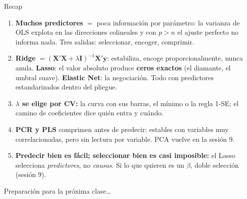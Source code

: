 \documentclass{beamer}
\newcommand{\1}{\mathbb{I}}
\begin{document}
\begin{frame}{Recap}
\small
\begin{enumerate}\itemsep6pt
  \item \textbf{Muchos predictores} $=$ poca información por parámetro: la varianza de OLS explota en las direcciones colineales y con $p > n$ el ajuste perfecto no informa nada. Tres salidas: seleccionar, encoger, comprimir.
  \item \textbf{Ridge} $= (\mathbf{X}'\mathbf{X} + \lambda\mathbf{I})^{-1}\mathbf{X}'\mathbf{y}$: estabiliza, encoge proporcionalmente, nunca anula. \textbf{Lasso}: el valor absoluto produce \textbf{ceros exactos} (el diamante, el umbral suave). \textbf{Elastic Net}: la negociación. Todo con predictores estandarizados dentro del pliegue.
  \item \textbf{$\lambda$ se elige por CV:} la curva con sus barras, el mínimo o la regla 1-SE; el camino de coeficientes dice quién entra y cuándo.
  \item \textbf{PCR y PLS} comprimen antes de predecir: estables con variables muy correlacionadas, pero sin lectura por variable. PCA vuelve en la sesión 9.
  \item \textbf{Predecir bien es fácil; seleccionar bien es casi imposible:} el Lasso selecciona \emph{predictores}, no \emph{causas}. Si lo que quieren es un $\beta$, doble selección (sesión 9).
\end{enumerate}
\end{frame}

\begin{frame}
\vspace{2.0cm}
\Large{Preparación para la próxima clase\ldots}
\end{frame}

\end{document}
